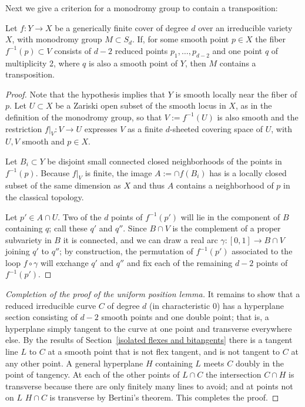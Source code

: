 Next we give a criterion for a monodromy group to contain a transposition:

\begin{lemma}\label{transposition lemma}
Let $f : Y \to X$ be a generically finite cover of degree $d$ over an irreducible variety $X$, with  monodromy group $M \subset S_d$.  
If,  for some smooth point $p \in X$ the fiber $f^{-1}(p)\subset V$ consists of $d-2$ reduced points $p_1,\dots, p_{d-2}$ and one point $q$ of multiplicity 2, where $q$ is also a smooth point of $Y$, then $M$ contains a transposition.
\end{lemma}


\begin{proof} Note that the hypothesis implies that $Y$ is smooth
locally near the fiber of $p$. Let $U \subset X$ be a Zariski open subset of the smooth locus in $X$, as in the definition of the monodromy group, so that  $V := f^{-1}(U)$ is also smooth and the restriction $f|_V : V \to U$ expresses $V$ as a finite $d$-sheeted covering space of $U$, with $U,V$ smooth and $p\in X$.

Let $B_i\subset Y$ be disjoint small connected closed neighborhoods of the points
in $f^{-1}(p)$. Because $f|_V$  is finite, the image $A := \cap f(B_i)$ has is a locally
closed subset of the same dimension as $X$ and thus $A$
 contains a neighborhood
of $p$ in the classical topology.

Let $p' \in A \cap U$. Two of the $d$ points of $f^{-1}(p')$ will lie in the component  of $B$ containing $q$; call these $q'$ and $q''$. Since $B \cap V$ is the complement of a proper subvariety in $B$ it is connected, and we can draw a real arc $\gamma : [0,1] \to B \cap V$ joining $q'$ to $q''$; by construction, the permutation of $f^{-1}(p')$ associated to the loop $f \circ \gamma$ will exchange $q'$ and $q''$ and fix each of the remaining $d-2$ points of $f^{-1}(p')$.
\end{proof}

\begin{proof}[Completion of the proof of the uniform position lemma]
 It remains to show that a reduced irreducible curve $C$ of degree $d$ (in characteristic 0)
 has a hyperplane section consisting of $d-2$ smooth points and one double point; that is, a hyperplane simply tangent to the curve at one point and transverse everywhere else. By the results of 
 Section~\ref{isolated flexes and bitangents} there is a tangent line $L$ to $C$ at a smooth point that is not flex tangent, and is not tangent to $C$ at any other point. A general hyperplane $H$ containing $L$ meets $C$ doubly in the point of
 tangency. At each of the other points of $L\cap C$ the intersection $C\cap H$ is transverse because there are only finitely many lines to avoid; and at points not on $L$ $H\cap C$ is transverse by Bertini's theorem. This completes the proof.
\end{proof}

